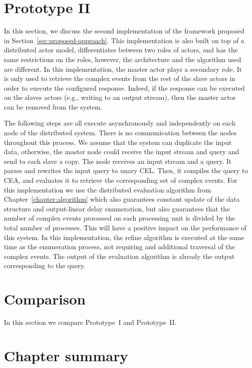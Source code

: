 
\section{Prototype II}\label{sec:prototype:II}

In this section, we discuss the second implementation of the framework proposed in Section~\ref{sec:proposed-approach}. This implementation is also built on top of a distributed actor model, differentiates between two roles of actors, and has the same restrictions on the roles, however, the architecture and the algorithm used are different. In this implementation, the master actor plays a secondary role. It is only used to retrieve the complex events from the rest of the slave actors in order to execute the configured response. Indeed, if the response can be executed on the slaves actors (e.g., writing to an output stream), then the master actor can be removed from the system.

The following steps are all execute asynchronously and independently on each node of the distributed system. There is no communication between the nodes throughout this process. We assume that the system can duplicate the input data, otherwise, the master node could receive the input stream and query and send to each slave a copy. The node receives an input stream and a query. It parses and rewrites the input query to unary CEL. Then, it compiles the query to CEA, and evaluates it to retrieve the corresponding set of complex events. For this implementation we use the distributed evaluation algorithm from Chapter~\ref{chapter:algorithm} which also guarantees constant update of the data structure and output-linear delay enumeration, but also guarantees that the number of complex events processed on each processing unit is divided by the total number of processes. This will have a positive impact on the performance of this system. In this implementation, the refine algorithm is executed at the same time as the enumeration process, not requiring and additional traversal of the complex events. The output of the evaluation algorithm is already the output corresponding to the query.

\section{Comparison}\label{comparison}

In this section we compare Prototype~I and Prototype~II.

\section{Chapter summary}

